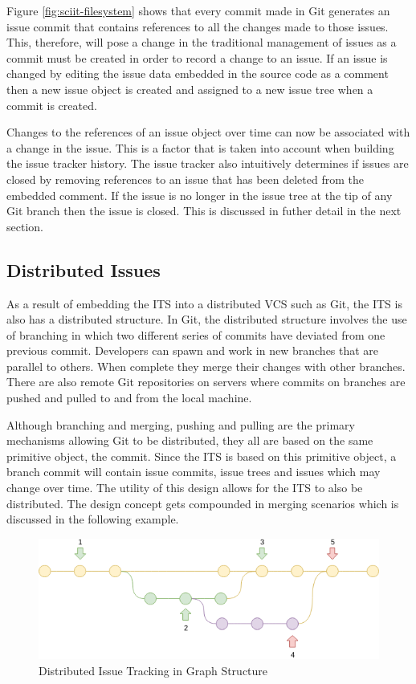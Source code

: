 \documentclass{mproj}
\begin{document}
Figure \ref{fig:sciit-filesystem} shows that every commit made in Git generates an issue commit that contains references to all the changes made to those issues. This, therefore, will pose a change in the traditional management of issues as a commit must be created in order to record a change to an issue. If an issue is changed by editing the issue data embedded in the source code as a comment then a new issue object is created and assigned to a new issue tree when a commit is created. 

Changes to the references of an issue object over time can now be associated with a change in the issue. This is a factor that is taken into account when building the issue tracker history. The issue tracker also intuitively determines if issues are closed by removing references to an issue that has been deleted from the embedded comment. If the issue is no longer in the issue tree at the tip of any Git branch then the issue is closed. This is discussed in futher detail in the next section.

\subsection{Distributed Issues}

As a result of embedding the ITS into a distributed VCS such as Git, the ITS is also has a distributed structure. In Git, the distributed structure involves the use of branching in which two different series of commits have deviated from one previous commit. Developers can spawn and work in new branches that are parallel to others. When complete they merge their changes with other branches. There are also remote Git repositories on servers where commits on branches are pushed and pulled to and from the local machine.

Although branching and merging, pushing and pulling are the primary mechanisms allowing Git to be distributed, they all are based on the same primitive object, the commit. Since the ITS is based on this primitive object, a branch commit will contain issue commits, issue trees and issues which may change over time. The utility of this design allows for the ITS to also be distributed. The design concept gets compounded in merging scenarios which is discussed in the following example.


\begin{figure}[h!]
\caption{Distributed Issue Tracking in Graph Structure}
\label{fig:distributed-issue-tracking}
\centering
\includegraphics[width=15cm]{distributed-issue-tracking}
\end{figure}
\end{document}
